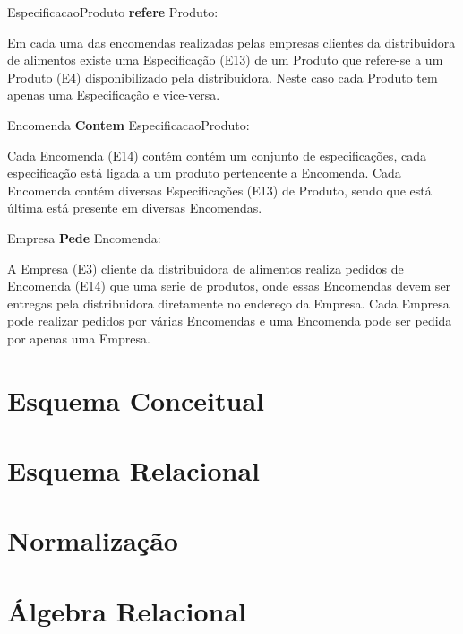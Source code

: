\documentclass[12pt, onecolumn, titlepage]{article}
\begin{document}
\begin{description}
\item EspecificacaoProduto \textbf{refere} Produto: 
\item \qquad Em cada uma das encomendas realizadas pelas empresas clientes da distribuidora de alimentos existe uma Especificação (E13) de um Produto que refere-se a um Produto (E4) disponibilizado pela distribuidora. Neste caso cada Produto tem apenas uma Especificação e vice-versa. 

\item Encomenda \textbf{Contem} EspecificacaoProduto: 
\item \qquad Cada Encomenda (E14) contém contém um conjunto de especificações, cada especificação está ligada a um produto pertencente a Encomenda. Cada Encomenda contém diversas Especificações (E13) de Produto, sendo que está última está presente em diversas Encomendas.

\item Empresa \textbf{Pede} Encomenda: 
\item \qquad A Empresa (E3) cliente da distribuidora de alimentos realiza pedidos de Encomenda (E14) que uma serie de produtos, onde essas Encomendas devem ser entregas pela distribuidora diretamente no endereço da Empresa. Cada Empresa pode realizar pedidos por várias Encomendas e uma Encomenda pode ser pedida por apenas uma Empresa.

\end{description}

\section{Esquema Conceitual}
\label{sect:conceitual}


\section{Esquema Relacional}
\label{sect:relacional}


\section{Normalização}
\label{sect:normalizacao}


\section{Álgebra Relacional}
\label{sect:algebra}
\end{document}
